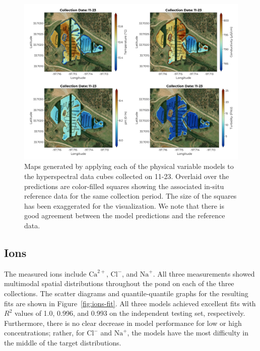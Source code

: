 \documentclass[remotesensing,article,submit,pdftex,moreauthors]{Definitions/mdpi}
\begin{document}
\begin{figure}
\centering
\includegraphics[width=\columnwidth]{paper/figures/results/maps/physical.pdf}
\caption{Maps generated by applying each of the physical variable models to the hyperspectral data cubes collected on 11-23. Overlaid over the predictions are color-filled squares showing the associated in-situ reference data for the same collection period. The size of the squares has been exaggerated for the visualization. We note that there is good agreement between the model predictions and the reference data. \label{fig:map-physical}}
\end{figure}  



\subsection{Ions}

The measured ions include $\mathrm{Ca}^{2+}$, $\mathrm{Cl}^{-}$, and $\mathrm{Na}^{+}$. All three measurements showed multimodal spatial distributions throughout the pond on each of the three collections. The scatter diagrams and quantile-quantile graphs for the resulting fits are shown in Figure~\ref{fig:ions-fit}. All three models achieved excellent fits with $R^2$ values of 1.0, 0.996, and 0.993 on the independent testing set, respectively. Furthermore, there is no clear decrease in model performance for low or high concentrations; rather, for $\textrm{Cl}^{-}$ and $\textrm{Na}^{+}$, the models have the most difficulty in the middle of the target distributions. 
\end{document}
